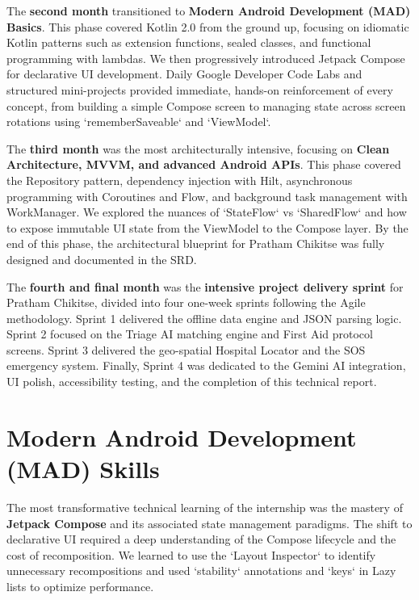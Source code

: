 \documentclass[12pt,a4paper]{report}
\begin{document}
\vspace{0.4cm}

The \textbf{second month} transitioned to \textbf{Modern Android Development (MAD) Basics}. This phase covered Kotlin 2.0 from the ground up, focusing on idiomatic Kotlin patterns such as extension functions, sealed classes, and functional programming with lambdas. We then progressively introduced Jetpack Compose for declarative UI development. Daily Google Developer Code Labs and structured mini-projects provided immediate, hands-on reinforcement of every concept, from building a simple Compose screen to managing state across screen rotations using `rememberSaveable` and `ViewModel`.

\vspace{0.4cm}

The \textbf{third month} was the most architecturally intensive, focusing on \textbf{Clean Architecture, MVVM, and advanced Android APIs}. This phase covered the Repository pattern, dependency injection with Hilt, asynchronous programming with Coroutines and Flow, and background task management with WorkManager. We explored the nuances of `StateFlow` vs `SharedFlow` and how to expose immutable UI state from the ViewModel to the Compose layer. By the end of this phase, the architectural blueprint for Pratham Chikitse was fully designed and documented in the SRD.

\vspace{0.4cm}

The \textbf{fourth and final month} was the \textbf{intensive project delivery sprint} for Pratham Chikitse, divided into four one-week sprints following the Agile methodology. Sprint 1 delivered the offline data engine and JSON parsing logic. Sprint 2 focused on the Triage AI matching engine and First Aid protocol screens. Sprint 3 delivered the geo-spatial Hospital Locator and the SOS emergency system. Finally, Sprint 4 was dedicated to the Gemini AI integration, UI polish, accessibility testing, and the completion of this technical report.

\section{Modern Android Development (MAD) Skills}

The most transformative technical learning of the internship was the mastery of \textbf{Jetpack Compose} and its associated state management paradigms. The shift to declarative UI required a deep understanding of the Compose lifecycle and the cost of recomposition. We learned to use the `Layout Inspector` to identify unnecessary recompositions and used `stability` annotations and `keys` in Lazy lists to optimize performance.
\end{document}
